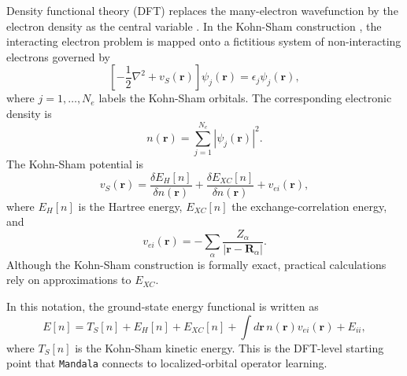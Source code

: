 Density functional theory (DFT) replaces the many-electron wavefunction by the
electron density as the central variable \cite{HoKo1964}. In the Kohn-Sham
construction \cite{KoSh1965}, the interacting electron problem is mapped onto a
fictitious system of non-interacting electrons governed by
\begin{equation}
\left[
-\frac{1}{2}\nabla^2 + v_S(\bm{r})
\right]\psi_j(\bm{r}) = \epsilon_j \psi_j(\bm{r}),
\end{equation}
where $j=1,\dots,N_e$ labels the Kohn-Sham orbitals. The corresponding
electronic density is
\begin{equation}
n(\bm{r}) = \sum_{j=1}^{N_e} |\psi_j(\bm{r})|^2.
\end{equation}
The Kohn-Sham potential is
\begin{equation}
v_S(\bm{r}) =
\frac{\delta E_H[n]}{\delta n(\bm{r})}
+ \frac{\delta E_{XC}[n]}{\delta n(\bm{r})}
+ v_{ei}(\bm{r}),
\end{equation}
where $E_H[n]$ is the Hartree energy, $E_{XC}[n]$ the exchange-correlation
energy, and
\begin{equation}
v_{ei}(\bm{r}) = -\sum_{\alpha} \frac{Z_{\alpha}}{|\bm{r}-\bm{R}_{\alpha}|}.
\end{equation}
Although the Kohn-Sham construction is formally exact, practical calculations
rely on approximations to $E_{XC}$.

In this notation, the ground-state energy functional is written as
\begin{equation}
E[n] =
T_S[n] + E_H[n] + E_{XC}[n]
+ \int d\bm{r}\, n(\bm{r}) v_{ei}(\bm{r})
+ E_{ii},
\end{equation}
where $T_S[n]$ is the Kohn-Sham kinetic energy. This is the DFT-level starting
point that \texttt{Mandala} connects to localized-orbital operator learning.

